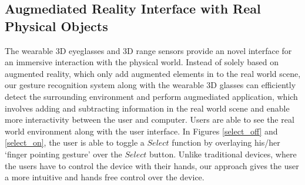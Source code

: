 \subsection{Augmediated Reality Interface with Real Physical Objects}
The wearable 3D eyeglasses and 3D range sensors provide an novel interface for an immersive interaction with the physical world. Instead of solely based on augmented reality, which only add augmented elements in to the real world scene, our gesture recognition system along with the wearable 3D glasses can efficiently detect the surrounding environment and perform augmediated application, which involves adding and subtracting information in the real world scene and enable more interactivity between the user and computer. Users are able to see the real world environment along with the user interface. In Figures \ref{select_off} and \ref{select_on}, the user is able to toggle a $Select$ function by overlaying his/her `finger pointing gesture' over the $Select$ button.  Unlike traditional devices, where the users have to control the device with their hands, our approach gives the user a more intuitive and hands free control over the device.

